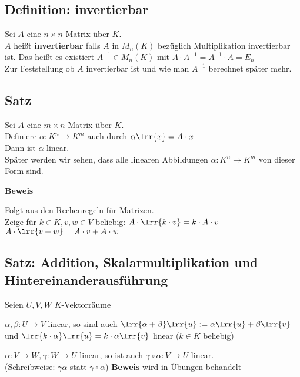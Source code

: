 \subsection{Definition: invertierbar}
	Sei $A$ eine $n\times n$-Matrix über $K$.\\
	$A$ heißt \textbf{invertierbar} falls $A$ in $M_n(K)$ bezüglich Multiplikation invertierbar ist. Das heißt es existiert $A^{-1}\in M_n(K)$ mit $A\cdot A^{-1}=A^{-1}\cdot A=E_n$ \\
	Zur Feststellung ob $A$ invertierbar ist und wie man $A^{-1}$ berechnet später mehr.

\subsection{Satz}
	Sei $A$ eine $m\times n$-Matrix über $K$.\\
	Definiere $\alpha:K^n\rightarrow K^m$ auch durch $\alpha\lrr{x}=A\cdot x$\\
	Dann ist $\alpha$ linear.\\
	Später werden wir sehen, dass alle linearen Abbildungen $\alpha:K^n\rightarrow K^m$ von dieser Form sind.

	\textbf{Beweis}

	Folgt aus den Rechenregeln für Matrizen.\\
	Zeige für $k\in K, v,w\in V$ beliebig: $A\cdot\lrr{k\cdot v}=k\cdot A\cdot v$\\
	$A\cdot\lrr{v+w}=A\cdot v+A\cdot w$

\subsection{Satz: Addition, Skalarmultiplikation und Hintereinanderausführung}
	Seien $U,V,W$ $K$-Vektorräume
		\item $\alpha,\beta:U\rightarrow V$ linear, so sind auch $\lrr{\alpha+\beta}\lrr{u}:=\alpha\lrr{u}+\beta\lrr{v}$ und $\lrr{k\cdot\alpha}\lrr{u}=k\cdot\alpha\lrr{v}$ linear ($k\in K$ beliebig)
		\item $\alpha:V\rightarrow W,\gamma:W\rightarrow U$ linear, so ist auch $\gamma\circ\alpha:V\rightarrow U$ linear.\\
			(Schreibweise: $\gamma\alpha$ statt $\gamma\circ\alpha$)
	\subExEnd
	\textbf{Beweis} wird in Übungen behandelt

